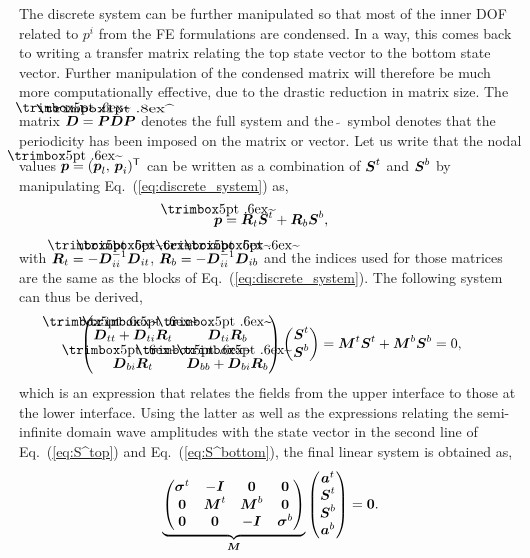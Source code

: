 The discrete system can be further manipulated so that most of the inner DOF related to $p^i$ from the FE formulations are condensed. In a way, this comes back to writing a transfer matrix relating the top state vector to the bottom state vector. Further manipulation of the condensed matrix will therefore be much more computationally effective, due to the drastic reduction in matrix size. The matrix $\mbf{\tilde D} = \mbf{\hat P}\mbf D \mbf P$ denotes the full system and the $\,\tilde{}\,$ symbol denotes that the periodicity has been imposed on the matrix or vector. Let us write that the nodal values $\tilde{\mbf p} = (\mbf p_l, \, \mbf p_i)^\transp$ can be written as a combination of $\boldsymbol S^t$ and $\boldsymbol S^b$ by manipulating Eq.~(\ref{eq:discrete_system}) as,
\begin{equation}
    \tilde{\mbf p} = \mbf R_t \mbf S^t + \mbf R_b \mbf S^b, 
    \label{eq:condensation_dof}
\end{equation}
with $\mbf R_t = - \tilde{\mbf D}_{ii}^{-1} \tilde{\mbf D}_{it}$, $\mbf R_b = - \tilde{\mbf D}_{ii}^{-1} \tilde{\mbf D}_{ib}$ and the indices used for those matrices are the same as the blocks of Eq.~(\ref{eq:discrete_system}). The following system can thus be derived,
\begin{equation}
    \begin{pmatrix}
            \tilde{\mbf D}_{tt} + \tilde{\mbf D}_{ti} \mbf R_t & \tilde{\mbf D}_{ti}\mbf R_b \\
            \tilde{\mbf D}_{bi}\mbf R_t & \tilde{\mbf D}_{bb} + \tilde{\mbf D}_{bi} \mbf R_b
        \end{pmatrix} \begin{pmatrix}
            \mbf S^t \\ \mbf S^b 
        \end{pmatrix} = 
        \mbf M^t \mbf S^t + \mbf M^b \mbf S^b = 0, 
        \label{eq:condenS^tb}
\end{equation}
which is an expression that relates the fields from the upper interface to those at the lower interface. Using the latter as well as the expressions relating the semi-infinite domain wave amplitudes with the state vector in the second line of Eq.~(\ref{eq:S^top}) and Eq.~(\ref{eq:S^bottom}), the final linear system is obtained as,
\begin{equation}
    \underbrace{\begin{pmatrix}
        \boldsymbol \sigma^t & -\boldsymbol I & \boldsymbol 0 & \boldsymbol 0 \\
        \boldsymbol 0 & \boldsymbol M^t & \boldsymbol M^b & \boldsymbol 0 \\
        \boldsymbol 0 & \boldsymbol 0 & -\boldsymbol I & \boldsymbol \sigma^b \\
    \end{pmatrix}    }_{\boldsymbol M}
    \begin{pmatrix}
        \boldsymbol a^t \\ \boldsymbol S^t \\ \boldsymbol S^b \\ \boldsymbol a^b \\ 
    \end{pmatrix} = \boldsymbol 0.
    \label{eq:final_system}
\end{equation}
